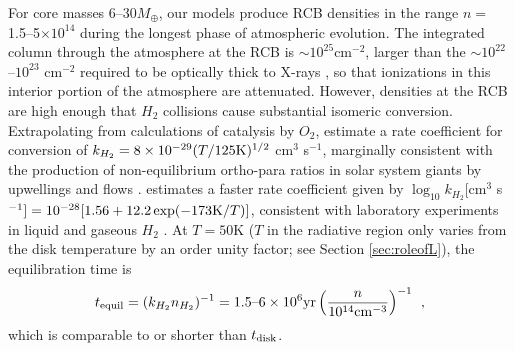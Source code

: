 For core masses 6--30$M_\oplus$, our models produce RCB densities in the range $n = $1.5--5$\times 10^{14}$ during the longest phase of atmospheric evolution.  The integrated column through the atmosphere at the RCB is $\sim$$10^{25}$cm$^{-2}$, larger than the $\sim$$10^{22}$--$10^{23}$ cm$^{-2}$ required to be optically thick to X-rays \citep{glassgold97}, so that ionizations in this interior portion of the atmosphere are attenuated. 
However, densities at the RCB are high enough that 
$H_2$ collisions cause substantial isomeric conversion.
Extrapolating from calculations of catalysis by $O_2$,  \citet{conrath84} estimate a rate coefficient for conversion of $k_{H_2} = 8\times 10^{-29} (T/125 {\rm K})^{1/2}$ cm$^3$ s$^{-1}$, 
marginally consistent with the production of non-equilibrium ortho-para ratios in solar system giants by upwellings and flows
 \citep[e.g.][]{fouchet03}. \citet{huestis08} estimates a faster rate coefficient given by $\log_{10} k_{H_2} [$cm$^3$ s$^{-1}] = 10^{-28}[1.56+12.2\exp(-173{\rm K}/T )]$, consistent with laboratory experiments in liquid and gaseous $H_2$ \citep{farkas35, milenko97}.  
 At $T = 50$K ($T$ in the radiative region only varies from the disk temperature by an order unity factor; see Section \ref{sec:roleofL}), the equilibration time is
\begin{equation}
t_{\rm equil} = (k_{H_2} n_{H_2})^{-1} = \text{1.5--6} \times 10^6 {\rm yr} \left(\frac{n}{10^{14} {\rm cm}^{-3}}\right)^{-1} \,\; ,
\end{equation}
which is comparable to or shorter than $t_{\rm disk}$.


